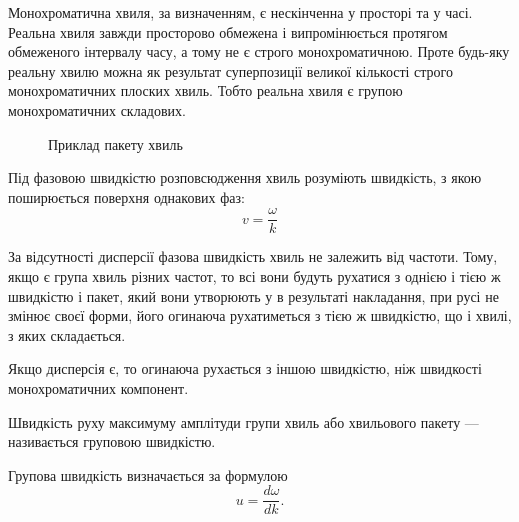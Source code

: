 Монохроматична хвиля, за визначенням, є нескінченна у просторі та у часі. Реальна хвиля завжди просторово обмежена і випромінюється протягом обмеженого інтервалу часу, а тому не є строго монохроматичною. Проте будь-яку реальну хвилю можна як результат суперпозиції великої кількості строго монохроматичних плоских хвиль. Тобто реальна хвиля є групою монохроматичних складових.

\begin{figure}[h!]\centering
	\caption{Приклад пакету хвиль}
\end{figure}

Під фазовою швидкістю розповсюдження хвиль розуміють швидкість, з якою поширюється
поверхня однакових фаз:
\begin{equation}\label{eq:pahse_velocity}
	v = \frac{\omega}{k}
\end{equation}


За відсутності дисперсії фазова швидкість хвиль не залежить від частоти. Тому, якщо є група хвиль різних частот, то всі вони будуть рухатися з однією і тією ж швидкістю і пакет, який вони утворюють у
в результаті накладання, при русі не змінює своєї форми, його огинаюча рухатиметься з тією ж швидкістю, що і хвилі, з яких складається.

Якщо дисперсія є, то огинаюча рухається з іншою швидкістю, ніж швидкості монохроматичних компонент.

Швидкість руху максимуму амплітуди групи хвиль або хвильового пакету ---  називається груповою швидкістю.

%

Групова швидкість визначається за формулою
\begin{equation}\label{eq: group_velocity}
	u = \frac{d\omega}{dk}.
\end{equation}

